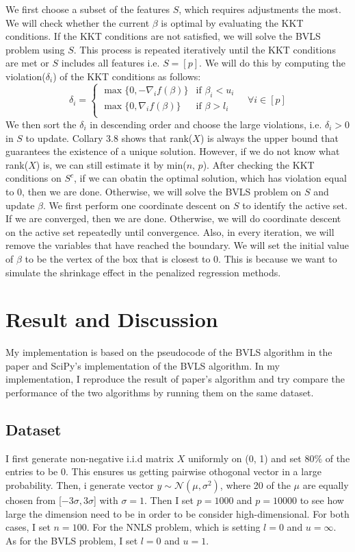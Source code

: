 \documentclass[11pt]{article}
\begin{document}
We first choose a subset of the features $S$, which requires adjustments the most. We will check
whether the current $\beta$ is optimal by evaluating the KKT conditions. If the KKT conditions are
not satisfied, we will solve the BVLS problem using $S$. This process is repeated iteratively 
until the KKT conditions are met or $S$ includes all features i.e. $S = [p]$. We will do this
by computing the violation($\delta_i$) of the KKT conditions as follows:
\begin{equation}
    \delta_i = \begin{cases}
        \max\{0, -\nabla_i f(\beta)\} & \text{if } \beta_i < u_i\\
        \max\{0, \nabla_i f(\beta)\} & \text{if } \beta > l_i\\
    \end{cases}
    \quad \forall i \in [p]
\end{equation}
We then sort the $\delta_i$ in descending order and choose the large violations, i.e. 
$\delta_i > 0$ in $S$ to update. Collary 3.8 shows that rank($X$) is always the upper bound
that guarantees the existence of a unique solution. However, if we do not know what rank($X$) is,
we can still estimate it by min($n$, $p$). After checking the KKT conditions on $S^c$, if we 
can obatin the optimal solution, which has violation equal to 0, then we are done. Otherwise,
we will solve the BVLS problem on $S$ and update $\beta$. We first perform one coordinate
descent on $S$ to identify the active set. If we are converged, then we are done. Otherwise, we
will do coordinate descent on the active set repeatedly until convergence. Also, in every 
iteration, we will remove the variables that have reached the boundary. We will set the initial
value of $\beta$ to be the vertex of the box that is closest to 0. This is because we want to
simulate the shrinkage effect in the penalized regression methods.

\section{Result and Discussion}
My implementation is based on the pseudocode of the BVLS algorithm in the paper and SciPy's 
implementation of the BVLS algorithm. In my implementation, I reproduce the result of paper's
algorithm and try compare the performance of the two algorithms by running them on the same 
dataset.

\subsection{Dataset}
I first generate non-negative i.i.d matrix $X$ uniformly on (0, 1) and set $80\%$ of the 
entries to be 0. This ensures us getting pairwise othogonal vector in a large probability. 
Then, i generate vector $y \sim \mathcal{N}(\mu,\sigma^{2})$, where 20 of the $\mu$ are equally 
chosen from [$-3\sigma, 3\sigma$] with $\sigma = 1$. Then I set $p = 1000$ and $p = 10000$ to 
see how large the dimension need to be in order to be consider high-dimensional. For both cases,
I set $n = 100$. For the NNLS problem, which is setting $l = 0$ and $u = \infty$. As for the BVLS
problem, I set $l = 0$ and $u = 1$.
\end{document}
